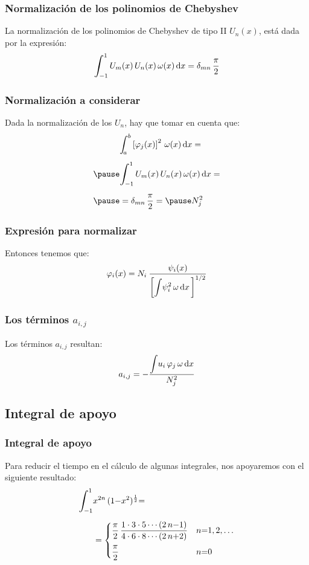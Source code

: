 \documentclass[12pt]{beamer}
\begin{document}
\begin{frame}
\frametitle{Normalización de los polinomios de Chebyshev}
La normalización de los polinomios de Chebyshev de tipo II $U_{n}(x)$, está dada por la expresión:
\pause
\begin{align*}
\scaleint{6ex}_{\bs -1}^{1} \, U_{m}(x) \, U_{n} (x) \, \omega (x) \dd{x} = \delta_{mn} \, \dfrac{\pi}{2}
\end{align*}
\end{frame}
\begin{frame}
\frametitle{Normalización a considerar}
Dada la normalización de los $U_{n}$, hay que tomar en cuenta que:
\pause
\begin{eqnarray*}
&\scaleint{5ex}_{\bs a}^{b} \left[ \varphi_{j} (x) \right]^{2} \, \omega (x) \dd{x} = \\[0.5em] \pause
&\scaleint{6ex}_{\bs -1}^{1} \, U_{m}(x) \, U_{n} (x) \, \omega (x) \dd{x} = \\[0.5em] \pause
&= \delta_{mn} \, \dfrac{\pi}{2} = \pause N_{j}^{2}
\end{eqnarray*}
\end{frame}
\begin{frame}
\frametitle{Expresión para normalizar}
Entonces tenemos que:
\pause
\begin{align*}
\varphi_{i} (x) =  N_{i} \: \dfrac{\psi_{i} (x)}{ \bigg[ \displaystyle \scaleint{5ex} \psi_{i}^{2} \, \omega \dd{x} \bigg]^{1/2}}
\end{align*}
\end{frame}
\begin{frame}
\frametitle{Los términos $a_{i,j}$}
Los términos $a_{i,j}$ resultan:
\pause
\begin{align}
a_{i, j} = - \dfrac{ \displaystyle \scaleint{5ex} u_{i} \, \varphi_{j} \, \omega \dd{x}}{N_{j}^{2}}
\label{eq:ecuacion_10_49a}
\end{align}
\end{frame}    

\subsection*{Integral de apoyo}

\begin{frame}
\frametitle{Integral de apoyo}
Para reducir el tiempo en el cálculo de algunas integrales, nos apoyaremos con el siguiente resultado:
\pause
\begin{align*}
\scaleint{6ex}_{\bs -1}^{1} &x^{2n} \, (1 {-} x^{2})^{\frac{1}{2}} {=} \\[0.5em]
&= \begin{cases}
\dfrac{\pi}{2} \, \dfrac{1 \cdot 3 \cdot 5 \cdots (2 \, n {-} 1)}{4 \cdot 6 \cdot 8 \cdots (2 \, n {+} 2)} & n {=} 1, 2, \ldots \\[1em]
\dfrac{\pi}{2} & n {=} 0
\end{cases}
\end{align*}
\end{frame}
\end{document}
